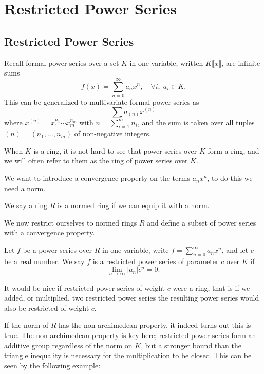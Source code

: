 \chapter{Restricted Power Series}

\section{Restricted Power Series}

Recall formal power series over a set $K$ in one variable, written $K \llbracket x \rrbracket $, are
infinite sums
\[
f(x) = \sum_{n=0}^\infty a_n x^n, \quad \forall i, \; a_i \in K.
\]
This can be generalized to multivariate formal power series as
\[
\sum a_{(n)} x^{(n)}
\]
where $x^{(n)} = x_1^{n_1} \cdots x_m^{n_m}$ with $n = \sum_{i = 1}^m n_i$, and the sum is taken
over all tuples $(n) = (n_1,\dots,n_m)$ of non-negative integers.

When $K$ is a ring, it is not hard to see that power series over $K$ form a ring, and we will often
refer to them as the ring of power series over $K$.

We want to introduce a convergence property on the terms $a_n x^n$, to do this we need a norm.

\begin{definition}
    We say a ring $R$ is a normed ring if we can equip it with a norm.
\end{definition}

We now restrict ourselves to normed rings $R$ and define a subset of power series with a convergence
property.

\begin{definition}
    Let $f$ be a power series over $R$ in one variable, write $f = \sum_{n=0}^\infty a_n x^n$, and
    let $c$ be a real number. We say $f$ is a restricted power series of parameter $c$ over $K$ if
    \[
    \lim_{n \to \infty} \lvert a_n \rvert c^n = 0.
    \]
\end{definition}

It would be nice if restricted power series of weight $c$ were a ring, that is if we added, or
multiplied, two restricted power series the resulting power series would also be restricted of
weight $c$.

If the norm of $R$ has the non-archimedean property, it indeed turns out this is true.
The non-archimedean property is key here; restricted power series form an additive group regardless
of the norm on $K$, but a stronger bound than the triangle inequality is necessary for the
multiplication to be closed. This can be seen by the following example:

